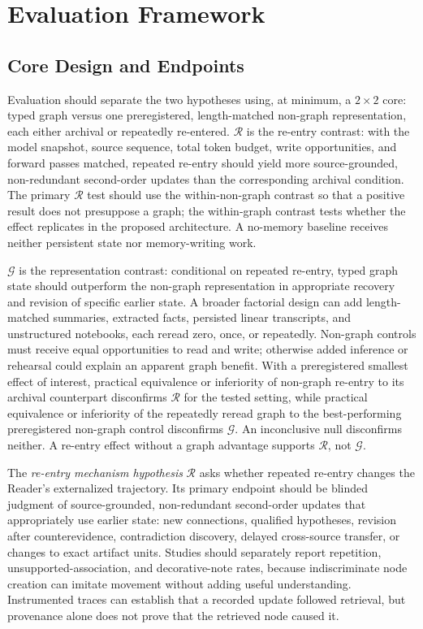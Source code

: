 \section{Evaluation Framework}
\label{sec:evaluation}

\subsection{Core Design and Endpoints}

Evaluation should separate the two hypotheses using, at minimum, a $2\times2$ core: typed graph versus one preregistered, length-matched non-graph representation, each either archival or repeatedly re-entered. $\mathcal{R}$ is the re-entry contrast: with the model snapshot, source sequence, total token budget, write opportunities, and forward passes matched, repeated re-entry should yield more source-grounded, non-redundant second-order updates than the corresponding archival condition. The primary $\mathcal{R}$ test should use the within-non-graph contrast so that a positive result does not presuppose a graph; the within-graph contrast tests whether the effect replicates in the proposed architecture. A no-memory baseline receives neither persistent state nor memory-writing work.

$\mathcal{G}$ is the representation contrast: conditional on repeated re-entry, typed graph state should outperform the non-graph representation in appropriate recovery and revision of specific earlier state. A broader factorial design can add length-matched summaries, extracted facts, persisted linear transcripts, and unstructured notebooks, each reread zero, once, or repeatedly. Non-graph controls must receive equal opportunities to read and write; otherwise added inference or rehearsal could explain an apparent graph benefit. With a preregistered smallest effect of interest, practical equivalence or inferiority of non-graph re-entry to its archival counterpart disconfirms $\mathcal{R}$ for the tested setting, while practical equivalence or inferiority of the repeatedly reread graph to the best-performing preregistered non-graph control disconfirms $\mathcal{G}$. An inconclusive null disconfirms neither. A re-entry effect without a graph advantage supports $\mathcal{R}$, not $\mathcal{G}$.

The \emph{re-entry mechanism hypothesis} $\mathcal{R}$ asks whether repeated re-entry changes the Reader's externalized trajectory. Its primary endpoint should be blinded judgment of source-grounded, non-redundant second-order updates that appropriately use earlier state: new connections, qualified hypotheses, revision after counterevidence, contradiction discovery, delayed cross-source transfer, or changes to exact artifact units. Studies should separately report repetition, unsupported-association, and decorative-note rates, because indiscriminate node creation can imitate movement without adding useful understanding. Instrumented traces can establish that a recorded update followed retrieval, but provenance alone does not prove that the retrieved node caused it.

